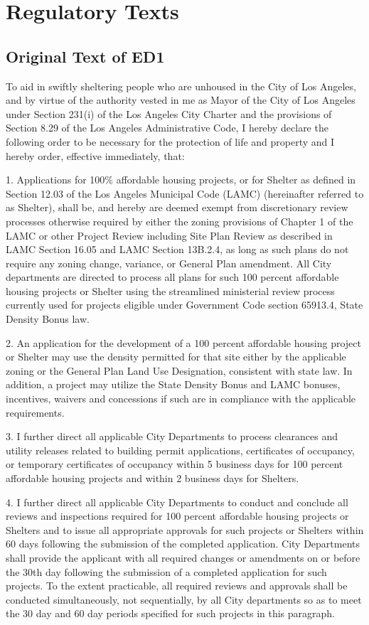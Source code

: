 \documentclass[12pt]{article}
\theoremstyle{definition}
\begin{document}
\newpage
\appendix
\section{Regulatory Texts}
\subsection{Original Text of ED1}
    
To aid in swiftly sheltering people who are unhoused in the City of Los Angeles, and by virtue of the authority vested in me as Mayor of the City of Los Angeles under Section 231(i) of the Los Angeles City Charter and the provisions of Section 8.29 of the Los Angeles Administrative Code, I hereby declare the following order to be necessary for the protection of life and property and I hereby order, effective immediately, that:

1. Applications for 100\% affordable housing projects, or for Shelter as defined in Section 12.03 of the Los Angeles Municipal Code (LAMC) (hereinafter referred to as Shelter), shall be, and hereby are deemed exempt from discretionary review processes otherwise required by either the zoning provisions of Chapter 1 of the LAMC or other Project Review including Site Plan Review as described in LAMC Section 16.05 and LAMC Section 13B.2.4, as long as such plans do not require any zoning change, variance, or General Plan amendment. All City departments are directed to process all plans for such 100 percent affordable housing projects or Shelter using the streamlined ministerial review process currently used for projects eligible under Government Code section 65913.4, State Density Bonus law.   

2. An application for the development of a 100 percent affordable housing project or Shelter may use the density permitted for that site either by the applicable zoning or the General Plan Land Use Designation, consistent with state law. In addition, a project may utilize the State Density Bonus and LAMC bonuses, incentives, waivers and concessions if such are in compliance with the applicable requirements. 

3. I further direct all applicable City Departments to process clearances and utility releases related to building permit applications, certificates of occupancy, or temporary certificates of occupancy within 5 business days for 100 percent affordable housing projects and within 2 business days for Shelters. 

4. I further direct all applicable City Departments to conduct and conclude all reviews and inspections required for 100 percent affordable housing projects or Shelters and to issue all appropriate approvals for such projects or Shelters within 60 days following the submission of the completed application. City Departments shall provide the applicant with all required changes or amendments on or before the 30th day following the submission of a completed application for such projects. To the extent practicable, all required reviews and approvals shall be conducted simultaneously, not sequentially, by all City departments so as to meet the 30 day and 60 day periods specified for such projects in this paragraph. 
\end{document}
